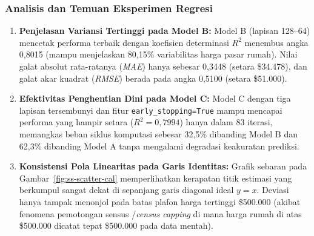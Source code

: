 \documentclass[a4paper,oneside,12pt]{report}
\begin{document}
\subsubsection{Analisis dan Temuan Eksperimen Regresi}
\begin{enumerate}[noitemsep, topsep=2pt, parsep=1pt]
	\item \textbf{Penjelasan Variansi Tertinggi pada Model B:} Model B (lapisan 128--64) mencetak performa terbaik dengan koefisien determinasi $R^2$ menembus angka 0,8015 (mampu menjelaskan 80,15\% variabilitas harga pasar rumah). Nilai galat absolut rata-ratanya (\textit{MAE}) hanya sebesar 0,3448 (setara \$34.478), dan galat akar kuadrat (\textit{RMSE}) berada pada angka 0,5100 (setara \$51.000).
	\item \textbf{Efektivitas Penghentian Dini pada Model C:} Model C dengan tiga lapisan tersembunyi dan fitur \texttt{early\_stopping=True} mampu mencapai performa yang hampir setara ($R^2 = 0,7994$) hanya dalam 83 iterasi, memangkas beban siklus komputasi sebesar 32,5\% dibanding Model B dan 62,3\% dibanding Model A tanpa mengalami degradasi keakuratan prediksi.
	\item \textbf{Konsistensi Pola Linearitas pada Garis Identitas:} Grafik sebaran pada Gambar~\ref{fig:ss-scatter-cal} memperlihatkan kerapatan titik estimasi yang berkumpul sangat dekat di sepanjang garis diagonal ideal $y=x$. Deviasi hanya tampak menonjol pada batas plafon harga tertinggi \$500.000 (akibat fenomena pemotongan sensus /\textit{census capping} di mana harga rumah di atas \$500.000 dicatat tepat \$500.000 pada data mentah).
\end{enumerate}

\clearpage
\end{document}
